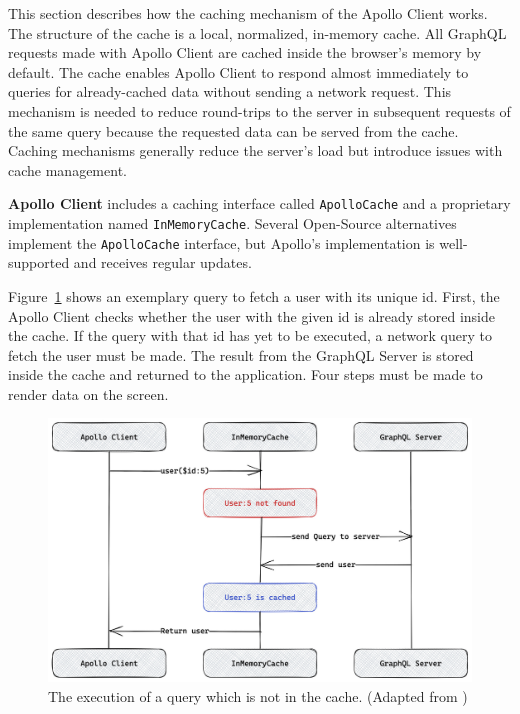 This section describes how the caching mechanism of the Apollo Client works. The structure of the cache is a local, normalized, in-memory cache. All GraphQL requests made with Apollo Client are cached inside the browser's memory by default. The cache enables Apollo Client to respond almost immediately to queries for already-cached data without sending a network request. This mechanism is needed to reduce round-trips to the server in subsequent requests of the same query because the requested data can be served from the cache. \cite{misc:-:background:graphql:apollo-client-cache-overview} Caching mechanisms generally reduce the server's load but introduce issues with cache management.

\bigskip

\noindent \textbf{Apollo Client} includes a caching interface called \texttt{ApolloCache} and a proprietary implementation named \texttt{InMemoryCache}. Several Open-Source alternatives implement the \texttt{ApolloCache} interface, but Apollo's implementation is well-supported and receives regular updates.

\bigskip

\noindent Figure~\ref{fig:background:graphql:user-query-first-time} shows an exemplary query to fetch a user with its unique id. First, the Apollo Client checks whether the user with the given id is already stored inside the cache. If the query with that id has yet to be executed, a network query to fetch the user must be made. The result from the GraphQL Server is stored inside the cache and returned to the application. Four steps must be made to render data on the screen. \cite{misc:-:background:graphql:apollo-client-cache-overview}

\ifshowImages
\begin{figure}[H]
    \centering
    \includegraphics[width=0.6\linewidth]{images/background/graphql/apollo/apollo-client-basic-cache.jpg}
    \caption{The execution of a query which is not in the cache. (Adapted from \cite{misc:-:background:graphql:apollo-client-cache-overview})}\label{fig:background:graphql:user-query-first-time}
\end{figure}
\fi

